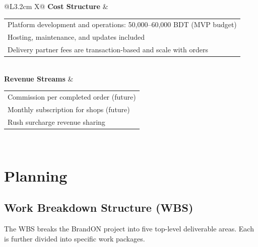 \documentclass[12pt,a4paper]{report}
\makeatletter
\newcommand{\celllines}[1]{\begin{tabular}[t]{@{}l@{}}#1\end{tabular}}
\makeatother
\begin{document}
\begin{xltabular}{\textwidth}{@{}L{3.2cm} X@{}}
  \midrule
  \textbf{Cost Structure}
    & \celllines{Platform development and operations: 50,000--60,000 BDT (MVP budget)\\Hosting, maintenance, and updates included\\Delivery partner fees are transaction-based and scale with orders} \\
  \midrule
  \textbf{Revenue Streams}
    & \celllines{Commission per completed order (future)\\Monthly subscription for shops (future)\\Rush surcharge revenue sharing} \\
\end{xltabular}
\renewcommand{\arraystretch}{1}
\normalsize
\endgroup

\chapter{Planning}

\section{Work Breakdown Structure (WBS)}

The WBS breaks the BrandON project into five top-level deliverable areas. Each is further divided into specific work packages.
\end{document}
